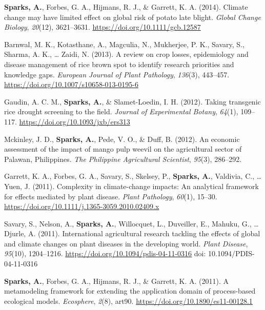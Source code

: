 \documentclass[11pt, a4paper]{awesome-cv}
\newcommand{\CSLBlock}[1]{#1\hfill\break}
\begin{document}
\leavevmode{}%
\textbf{Sparks, A.}, Forbes, G. A., Hijmans, R. J., \& Garrett, K. A.
(2014). Climate change may have limited effect on global risk of potato
late blight. \emph{Global Change Biology}, \emph{20}(12), 3621--3631.
\url{https://doi.org/10.1111/gcb.12587}

\leavevmode{}%
Barnwal, M. K., Kotasthane, A., Magculia, N., Mukherjee, P. K., Savary,
S., Sharma, A. K., \ldots{} Zaidi, N. (2013). A review on crop losses,
epidemiology and disease management of rice brown spot to identify
research priorities and knowledge gaps. \emph{European Journal of Plant
Pathology}, \emph{136}(3), 443--457.
\url{https://doi.org/10.1007/s10658-013-0195-6}

\leavevmode{}%
Gaudin, A. C. M., \textbf{Sparks, A.}, \& Slamet-Loedin, I. H. (2012).
Taking transgenic rice drought screening to the field. \emph{Journal of
Experimental Botany}, \emph{64}(1), 109--117.
\url{https://doi.org/10.1093/jxb/ers313}

\leavevmode{}%
Mckinley, J. D., \textbf{Sparks, A.}, Pede, V. O., \& Duff, B. (2012).
An economic assessment of the impact of mango pulp weevil on the
agricultural sector of {Palawan, Philippines}. \emph{The Philippine
Agricultural Scientist}, \emph{95}(3), 286--292.

\leavevmode{}%
Garrett, K. A., Forbes, G. A., Savary, S., Skelsey, P.,
\textbf{Sparks, A.}, Valdivia, C., \ldots{} Yuen, J. (2011). Complexity
in climate-change impacts: An analytical framework for effects mediated
by plant disease. \emph{Plant Pathology}, \emph{60}(1), 15--30.
\url{https://doi.org/10.1111/j.1365-3059.2010.02409.x}

\leavevmode{}%
Savary, S., Nelson, A., \textbf{Sparks, A.}, Willocquet, L., Duveiller,
E., Mahuku, G., \ldots{} Djurle, A. (2011). International agricultural
research tackling the effects of global and climate changes on plant
diseases in the developing world. \emph{Plant Disease}, \emph{95}(10),
1204--1216. \url{https://doi.org/10.1094/pdis-04-11-0316}
\CSLBlock{doi: 10.1094/PDIS-04-11-0316}

\leavevmode{}%
\textbf{Sparks, A.}, Forbes, G. A., Hijmans, R. J., \& Garrett, K. A.
(2011). A metamodeling framework for extending the application domain of
process-based ecological models. \emph{Ecosphere}, \emph{2}(8), art90.
\url{https://doi.org/10.1890/es11-00128.1}
\end{document}
